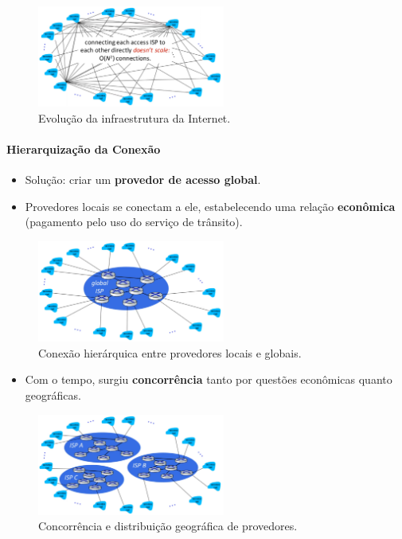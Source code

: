     \begin{figure}[H]
        \centering
        \includegraphics[width=0.55\textwidth]{img/cap-01/infraestrutura1.png}
        \caption{Evolução da infraestrutura da Internet.}
    \end{figure}

    \paragraph{Hierarquização da Conexão}
    \begin{itemize}
        \item Solução: criar um \textbf{provedor de acesso global}.
        \item Provedores locais se conectam a ele, estabelecendo uma relação \textbf{econômica} (pagamento pelo uso do serviço de trânsito).
    \end{itemize}

    \begin{figure}[H]
        \centering
        \includegraphics[width=0.55\textwidth]{img/cap-01/infraestrutura2.png}
        \caption{Conexão hierárquica entre provedores locais e globais.}
    \end{figure}

    \begin{itemize}
        \item Com o tempo, surgiu \textbf{concorrência} tanto por questões econômicas quanto geográficas.
    \end{itemize}

    \begin{figure}[H]
        \centering
        \includegraphics[width=0.55\textwidth]{img/cap-01/infraestrutura3.png}
        \caption{Concorrência e distribuição geográfica de provedores.}
    \end{figure}

